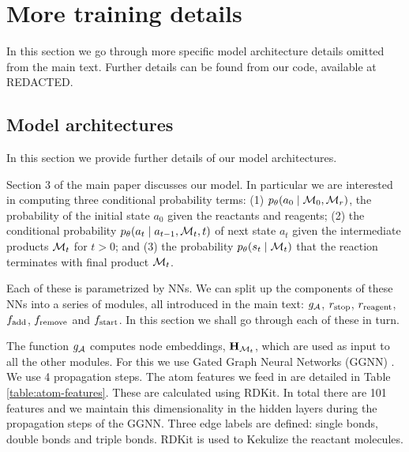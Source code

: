\documentclass{article}
\begin{document}
\section{More training details}

In this section we go through more specific model architecture details omitted from the main text. Further details can be found from our code, available at REDACTED.


\subsection{Model architectures}
In this section we provide further details of our model architectures.

Section 3 of the main paper discusses our model.
In particular we are interested in computing three conditional probability terms: (1) $p_\theta(a_0 \mid {\mathcal{M}}_0, {\mathcal{M}}_r)$, the probability of the initial state $a_0$ given the reactants and reagents; 
(2) the conditional probability $p_\theta(a_t \mid a_{t-1}, {\mathcal{M}}_t, t)$ 
of next state $a_t$ given the intermediate products ${\mathcal{M}}_t$ for $t > 0$;
and (3) the probability $p_\theta(s_t \mid {\mathcal{M}}_t)$ that the reaction terminates with final product ${\mathcal{M}}_{t}$.

Each of these is parametrized by NNs. We can split up the components of these NNs into a series of modules, all introduced in the main text: $g_{{\mathcal{A}}}$, $r_{\textrm{stop}}$, $r_\mathrm{reagent}$, $f_{\textrm{add}}$, $f_{\textrm{remove}}$ and $f_{\textrm{start}}$.
 In this section we shall go through each of these in turn.

The function $g_{{\mathcal{A}}}$ computes node embeddings, ${\mathbf{H}}_{{\mathcal{M}}_t}$, which are used as input to all the other modules. For this we use Gated Graph Neural Networks (GGNN) \citep{li2016gated, gilmer2017neural}.
 We use 4 propagation steps. 
 The atom features we feed in are detailed in Table \ref{table:atom-features}. These are calculated using RDKit. In total there are 101 features and we maintain this dimensionality in the hidden layers during the propagation steps of the GGNN. Three edge labels are defined: single bonds, double bonds and triple bonds. RDKit is used to Kekulize the reactant molecules. 
\end{document}
